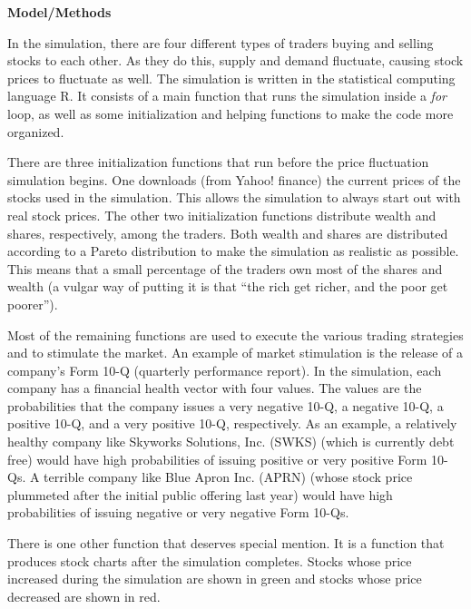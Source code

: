 \documentclass[12pt]{article}
\begin{document}
\vspace{5mm}

\begin{center}
\begin{large}
\noindent\textbf{Model/Methods}
\end{large}
\end{center}
In the simulation, there are four different types of traders buying and selling stocks to each other.  As they do this, supply and demand fluctuate, causing stock prices to fluctuate as well. The simulation is written in the statistical computing language R. It consists of a main function that runs the simulation inside a \textit{for} loop, as well as some initialization and helping functions to make the code more organized. 

There are three initialization functions that run before the price fluctuation simulation begins. One downloads (from Yahoo! finance) the current prices of the stocks used in the simulation. This allows the simulation to always start out with real stock prices.  The other two initialization functions distribute wealth and shares, respectively, among the traders.  Both wealth and shares are distributed according to a Pareto distribution to make the simulation as realistic as possible. This means that a small percentage of the traders own most of the shares and wealth (a vulgar way of putting it is that ``the rich get richer, and the poor get poorer'').

Most of the remaining functions are used to execute the various trading strategies and to stimulate the market.  An example of market stimulation is the release of a company's Form 10-Q (quarterly performance report).  In the simulation, each company has a financial health vector with four values.  The values are the probabilities that the company issues a very negative 10-Q, a negative 10-Q, a positive 10-Q, and a very positive 10-Q, respectively. As an example, a relatively healthy company like Skyworks Solutions, Inc. (SWKS) (which is currently debt free) would have high probabilities of issuing positive or very positive Form 10-Qs.  A terrible company like Blue Apron Inc. (APRN) (whose stock price plummeted after the initial public offering last year) would have high probabilities of issuing negative or very negative Form 10-Qs.

There is one other function that deserves special mention.  It is a function that produces stock charts after the simulation completes. Stocks whose price increased during the simulation are shown in green and stocks whose price decreased are shown in red. 
\end{document}
